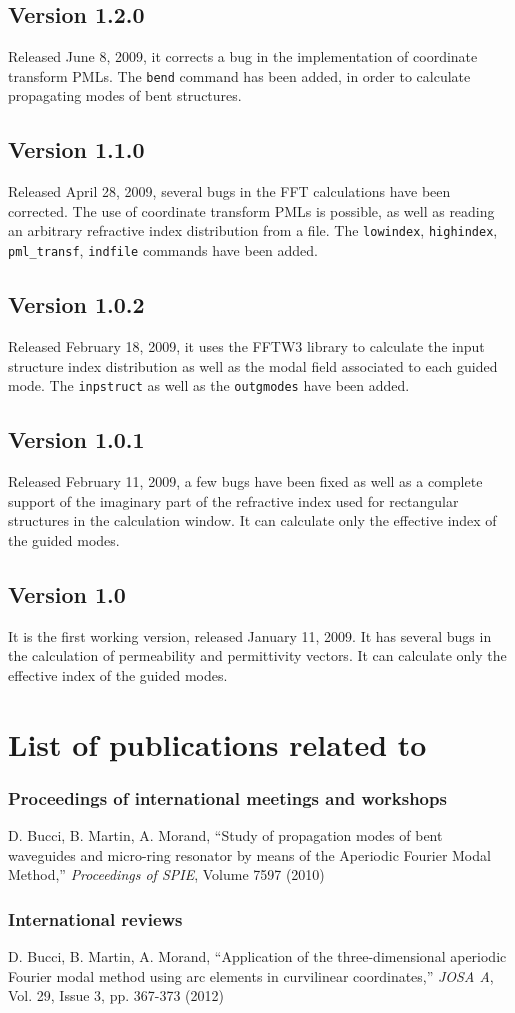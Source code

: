 \section{Version 1.2.0}
Released June 8, 2009, it corrects a bug in the implementation of coordinate transform PMLs.
The \lstinline!bend! command has been added, in order to calculate propagating modes of bent structures.

\section{Version 1.1.0}
Released April 28, 2009, several bugs in the FFT calculations have been 
corrected. The use of coordinate transform PMLs is possible, as well as reading an arbitrary refractive index distribution from a file.
The \lstinline!lowindex!, \lstinline!highindex!, \lstinline!pml_transf!, \lstinline!indfile! commands have been added.


\section{Version 1.0.2}
Released February 18, 2009, it uses the FFTW3 library to calculate the input structure index distribution as well as the modal field associated to each guided mode. The \lstinline!inpstruct! as well as the \lstinline!outgmodes! have been added. 
\section{Version 1.0.1}
Released February 11, 2009, a few bugs have been fixed as well as a complete support of the imaginary part of the refractive index used for rectangular structures in the calculation window. It can calculate only the effective index of the guided modes.
\section{Version 1.0}
It is the first working version, released January 11, 2009. It has several bugs in the calculation of permeability and permittivity vectors. It can calculate only the effective index of the guided modes.

\chapter{List of publications related to \afmm}

\subsection{Proceedings of international meetings and workshops}
D. Bucci, B. Martin, A. Morand, ``Study of propagation modes of bent waveguides and micro-ring resonator by means of the Aperiodic Fourier Modal Method,'' \textit{Proceedings of SPIE}, Volume 7597 (2010)

\subsection{International reviews}
D. Bucci, B. Martin, A. Morand, ``Application of the three-dimensional aperiodic Fourier modal method using arc elements in curvilinear coordinates,'' \textit{JOSA A}, Vol. 29, Issue 3, pp. 367-373 (2012)
